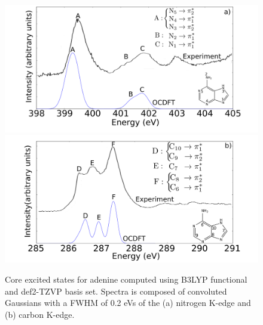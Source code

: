 \documentclass[11.5pt]{article}
\begin{document}
\begin{figure}[!ht]
\includegraphics[scale=0.20]{AdenineNspectra.png}
\includegraphics[scale=0.20]{AdenineCspectra.png}
\caption{Core excited states for adenine computed using B3LYP functional and def2-TZVP basis set. Spectra is composed of convoluted Gaussians with a FWHM of 0.2 eVs of the (a) nitrogen K-edge and (b) carbon K-edge.}
\label{figure:Adenine}
\end{figure}
\end{document}
